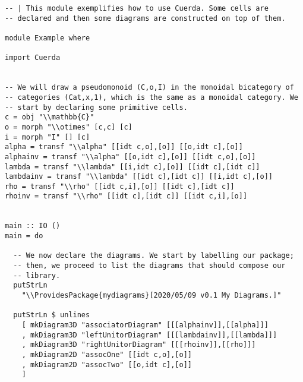 \documentclass{article}
\begin{document}
\begin{verbatim}
-- | This module exemplifies how to use Cuerda. Some cells are
-- declared and then some diagrams are constructed on top of them.

module Example where

import Cuerda


-- We will draw a pseudomonoid (C,o,I) in the monoidal bicategory of
-- categories (Cat,x,1), which is the same as a monoidal category. We
-- start by declaring some primitive cells.
c = obj "\\mathbb{C}"
o = morph "\\otimes" [c,c] [c]
i = morph "I" [] [c]
alpha = transf "\\alpha" [[idt c,o],[o]] [[o,idt c],[o]]
alphainv = transf "\\alpha" [[o,idt c],[o]] [[idt c,o],[o]]
lambda = transf "\\lambda" [[i,idt c],[o]] [[idt c],[idt c]]
lambdainv = transf "\\lambda" [[idt c],[idt c]] [[i,idt c],[o]]
rho = transf "\\rho" [[idt c,i],[o]] [[idt c],[idt c]]
rhoinv = transf "\\rho" [[idt c],[idt c]] [[idt c,i],[o]]


main :: IO ()
main = do

  -- We now declare the diagrams. We start by labelling our package;
  -- then, we proceed to list the diagrams that should compose our
  -- library.
  putStrLn
    "\\ProvidesPackage{mydiagrams}[2020/05/09 v0.1 My Diagrams.]"

  putStrLn $ unlines
    [ mkDiagram3D "associatorDiagram" [[[alphainv]],[[alpha]]]
    , mkDiagram3D "leftUnitorDiagram" [[[lambdainv]],[[lambda]]]
    , mkDiagram3D "rightUnitorDiagram" [[[rhoinv]],[[rho]]]
    , mkDiagram2D "assocOne" [[idt c,o],[o]]
    , mkDiagram2D "assocTwo" [[o,idt c],[o]]
    ]
\end{verbatim}
\end{document}
